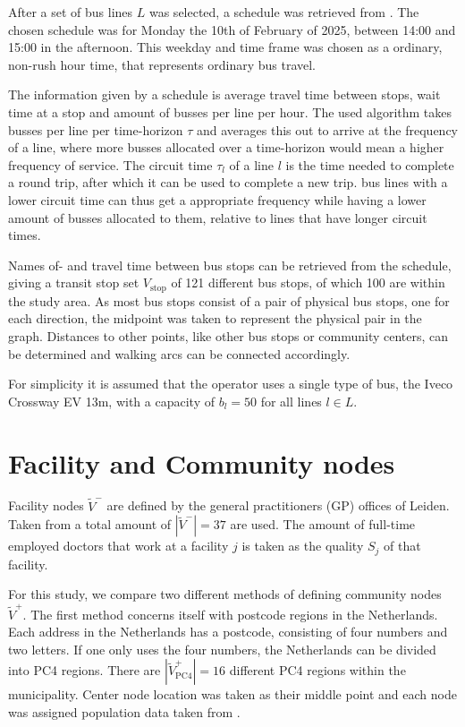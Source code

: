 After a set of bus lines $L$ was selected, a schedule was retrieved from \cite{Qbuzz}. The chosen schedule was for Monday the 10th of February of 2025, between 14:00 and 15:00 in the afternoon. This weekday and time frame was chosen as a ordinary, non-rush hour time, that represents ordinary bus travel.

The information given by a schedule is average travel time between stops, wait time at a stop and amount of busses per line per hour. The used algorithm takes busses per line per time-horizon $\tau$ and averages this out to arrive at the frequency of a line, where more busses allocated over a time-horizon would mean a higher frequency of service. The circuit time $\tau_l$ of a line $l$ is the time needed to complete a round trip, after which it can be used to complete a new trip. bus lines with a lower circuit time can thus get a appropriate frequency while having a lower amount of busses allocated to them, relative to lines that have longer circuit times.

Names of- and travel time between bus stops can be retrieved from the schedule, giving a transit stop set $V_\text{stop}$ of 121 different bus stops, of which 100 are within the study area. As most bus stops consist of a pair of physical bus stops, one for each direction, the midpoint was taken to represent the physical pair in the graph. Distances to other points, like other bus stops or community centers, can be determined and walking arcs can be connected accordingly.

For simplicity it is assumed that the operator uses a single type of bus, the Iveco Crossway EV 13m, with a capacity of $b_l = 50$ for all lines $l\in L$.

\section{Facility and Community nodes}
Facility nodes $\tilde V^-$ are defined by the general practitioners (GP) offices of Leiden. Taken from \cite{zorgkaart} a total amount of $|\tilde V^-| = 37$ are used. The amount of full-time employed doctors that work at a facility $j$ is taken as the quality $S_j$ of that facility.

For this study, we compare two different methods of defining community nodes $\tilde V^+$. The first method concerns itself with postcode regions in the Netherlands. Each address in the Netherlands has a postcode, consisting of four numbers and two letters. If one only uses the four numbers, the Netherlands can be divided into PC4 regions. There are $|\tilde V^+_\text{PC4}| = 16$ different PC4 regions within the municipality. Center node location was taken as their middle point and each node was assigned population data taken from \cite{allecijfers}.

